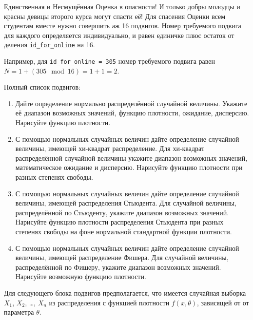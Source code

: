 \documentclass[12pt]{article}
\begin{document}
Единственная и Несмущённая Оценка в опасности! 
И только добры молодцы и красны девицы второго курса могут спасти её!
Для спасения Оценки всем студентам вместе нужно совершить аж 16 подвигов. 
Номер требуемого подвига для каждого определяется индивидуально, 
и равен единичке плюс остаток от деления 
\href{https://docs.google.com/spreadsheets/d/e/2PACX-1vT1hkcHBE7txa4maSh9BA8VOvQyZQTOIjsuMukOYr2MZlZkoMpNupBAyyRlZpugVOYXjKpgY2fI1JAc/pubhtml}{\texttt{id\_for\_online}} на 16.

Например, для \verb|id_for_online = 305| номер требуемого подвига равен $N = 1 + (305 \mod 16) = 1 + 1 = 2$.

Полный список подвигов:

\begin{enumerate}
    \item Дайте определение нормально распределённой случайной величины.
      Укажите её диапазон возможных значений, функцию плотности, ожидание, дисперсию.
      Нарисуйте функцию плотности.
    \item С помощью нормальных случайных величин дайте определение случайной величины, имеющей хи-квадрат распределение. 
      Для хи-квадрат распределённой случайной величины укажите диапазон возможных значений,
      математическое ожидание и дисперсию.
      Нарисуйте функцию плотности при разных степенях свободы.
    \item С помощью нормальных случайных величин дайте определение случайной величины, имеющей распределения Стьюдента.
      Для случайной величины, распределённой по Стьюденту, укажите диапазон возможных значений.
      Нарисуйте функцию плотности распределения Стьюдента при разных степенях свободы
      на фоне нормальной стандартной функции плотности.
    \item С помощью нормальных случайных величин дайте определение случайной величины, имеющей распределение Фишера. 
      Для случайной величины, распределённой по Фишеру, укажите диапазон возможных значений.
      Нарисуйте возможную функцию плотности.
  \end{enumerate}
  
  Для следующего блока подвигов предполагается, что
  имеется случайная выборка $X_1$, $X_2$, \ldots, $X_n$ из распределения
  с функцией плотности $f(x, \theta)$, зависящей от от параметра $\theta$.
  
\end{document}
